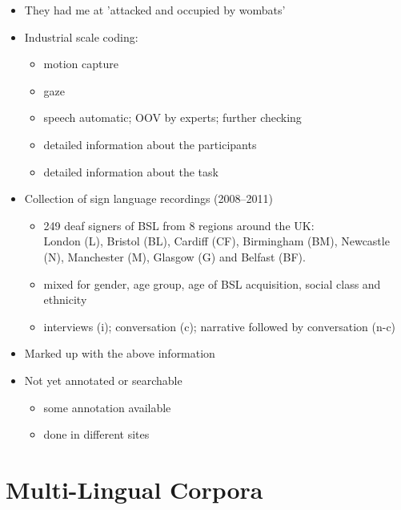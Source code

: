 \documentclass[a4paper,landscape,headrule,footrule,dvips]{foils}
\begin{document}
\begin{CJK}{UTF8}{min}

\begin{itemize}
\item They had me at 'attacked and occupied by wombats'
\item Industrial scale coding:
  \begin{itemize}
  \item motion capture
  \item gaze
  \item speech automatic; OOV by experts; further checking
  \item detailed information about the participants
  \item detailed information about the task
  \end{itemize}

\end{itemize}



\begin{itemize}
\item Collection of sign language recordings (2008--2011)
  \begin{itemize}
  \item 249 deaf signers of BSL from 8 regions around the UK: 
    \\London (L), Bristol (BL), Cardiff (CF), Birmingham (BM), Newcastle (N), Manchester (M), Glasgow (G) and Belfast (BF).
  \item mixed for gender, age group, age of BSL acquisition, social class and ethnicity
  \item  interviews (i); conversation (c); narrative followed by conversation (n-c)
  \end{itemize}
\item Marked up with the above information
\item Not yet annotated or searchable
  \begin{itemize}
  \item some annotation available
  \item done in different sites
  \end{itemize}
\end{itemize}



\section{Multi-Lingual Corpora}
\MyLogo{}


\end{CJK}
\end{document}
